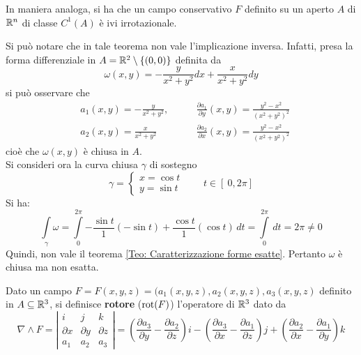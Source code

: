 In maniera analoga, si ha che un campo conservativo $F$ definito su un aperto $A$ di $\mathbb{R}^n$ di classe $C^1(A)$ è ivi irrotazionale.
\begin{example}
    Si può notare che in tale teorema non vale l'implicazione inversa. Infatti, presa la forma differenziale in $A=\mathbb{R}^2\setminus \left\{ (0,0)\right\} $ definita da
    \begin{equation*}
        \omega(x,y)= - \frac{y}{x^2+y^2}dx+ \frac{x}{x^2+y^2}dy
    \end{equation*}
    si può osservare che
    \begin{equation*}
        \begin{aligned}
            &a_1(x, y)= - \frac{y}{x^2+y^2}, \qquad &\frac{\partial a_1}{\partial y} (x, y) = \frac{y^2-x^2}{\left(x^2+y^2 \right)^2} \\
            &a_2(x,y)= \frac{x}{x^2+y^2} \qquad &\frac{\partial a_2}{\partial x} (x, y) = \frac{y^2-x^2}{\left(x^2+y^2 \right)^2}
        \end{aligned}
    \end{equation*}
    cioè che $\omega(x,y)$ è chiusa in $A$.\\
    Si consideri ora la curva chiusa $\gamma$ di sostegno
    \begin{equation*}
        \gamma= \begin{cases}
            x= \cos t\\
            y= \sin t
        \end{cases}
        \qquad t \in \left[\ 0, 2 \pi \right]
    \end{equation*}
    Si ha:
    \begin{equation*}
    \int\limits_{\gamma}{\omega}= \int\limits_{0}^{2\pi}{- \frac{\sin t}{1} (-\sin t) + \frac{\cos t}{1} (\cos t)}\, dt = \int\limits_{0}^{2\pi}{\,dt}= 2\pi \neq 0
    \end{equation*}
    Quindi, non vale il teorema \ref{Teo: Caratterizzazione forme esatte}. Pertanto $\omega$ è chiusa ma non esatta.
\end{example}
\begin{definition} \label{Def: Rotore}
Dato un campo $F= F(x,y,z)= (a_1(x,y,z), a_2(x,y,z), a_3(x,y,z)$ definito in $A \subseteq \mathbb{R}^3$, si definisce \textbf{rotore} ($\operatorname{rot}(F)$) l'operatore di $\mathbb{R}^3$ dato da
\begin{equation}
\nabla \wedge F = \left| \begin{matrix}
    i & j & k \\
    \partial x & \partial y & \partial z\\
    a_1 & a_2 & a_3
\end{matrix}
\right|
= \left( \frac{\partial a_3}{\partial y} - \frac{\partial a_2}{\partial z} \right)i - \left( \frac{\partial a_3}{\partial x} - \frac{\partial a_1}{\partial z} \right)j + \left( \frac{\partial a_2}{\partial x} - \frac{\partial a_1}{\partial y}\right)k 
\end{equation}
\end{definition}
